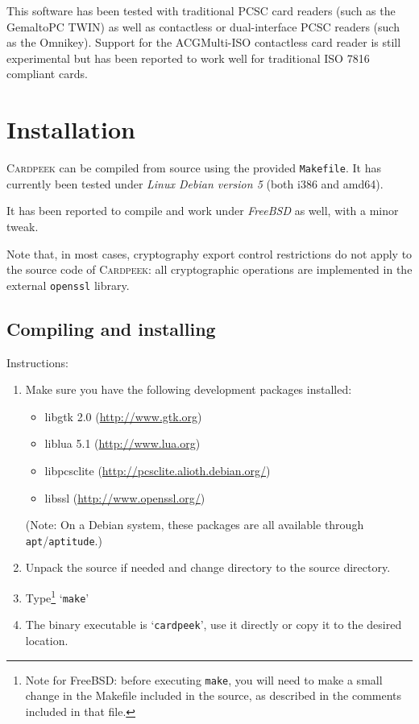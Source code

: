 \documentclass[11pt]{report}
\newcommand{\Cardpeek}{\textsc{Cardpeek}}
\begin{document}
This software has been tested with traditional PCSC card readers (such as the Gemalto\texttrademark PC TWIN) 
as well as contactless or dual-interface PCSC readers (such as the Omnikey). 
Support for the ACG\texttrademark Multi-ISO contactless card reader is still experimental but has been 
reported to work well for traditional ISO 7816 compliant cards.

\tableofcontents

\chapter{Installation}

\Cardpeek{} can be compiled from source using the provided \texttt{Makefile}.
It has currently been tested under \emph{Linux Debian version 5} (both i386 and amd64).

It has been reported to compile and work under \emph{FreeBSD} as well, with a minor tweak.

Note that, in most cases, cryptography export control restrictions do not apply to the source code
of \Cardpeek: all cryptographic operations are implemented in the external \texttt{openssl} 
library.

\section{Compiling and installing}

Instructions:
\begin{enumerate}
\item{Make sure you have the following development packages installed:
  \begin{itemize}
  \item{libgtk 2.0 (\url{http://www.gtk.org})}
  \item{liblua 5.1 (\url{http://www.lua.org})}
  \item{libpcsclite (\url{http://pcsclite.alioth.debian.org/})}
  \item{libssl (\url{http://www.openssl.org/})}
  \end{itemize}
(Note: On a Debian system, these packages are all available through \texttt{apt}/\texttt{aptitude}.)}
\item{Unpack the source if needed and change directory to the source directory.}
\item{Type\footnote{Note for FreeBSD: before executing \texttt{make}, 
you will need to make a small change in the Makefile included in the source, 
as described in the comments included in that file.} `\texttt{make}'}
\item{The binary executable is `\texttt{cardpeek}', use it directly or copy it to the desired location.}
\end{enumerate}
\end{document}
